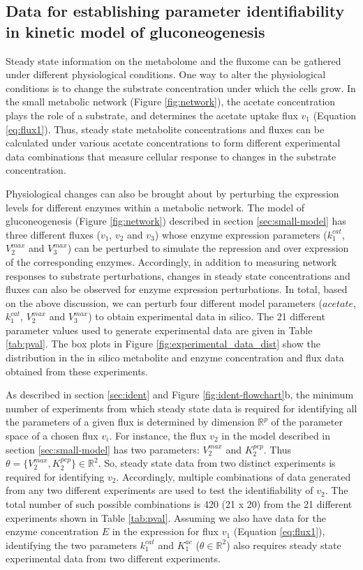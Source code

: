 \documentclass[10pt]{article}
\begin{document}
\subsection{Data for establishing parameter identifiability in kinetic model of gluconeogenesis}\label{sec:experiments}
Steady state information on the metabolome and the fluxome can be gathered under different physiological conditions. One way to alter the physiological conditions is to change the substrate concentration under which the cells grow. In the small metabolic network (Figure \ref{fig:network}), the acetate concentration plays the role of a substrate, and  determines the acetate uptake flux $v_1$ (Equation \ref{eq:flux1}). Thus, steady state metabolite concentrations and fluxes can be calculated under various acetate concentrations to form different experimental data combinations that measure cellular response to changes in the substrate concentration. 

Physiological changes can also be brought about by perturbing the expression levels for different enzymes within a metabolic network. The model of gluconeogenesis (Figure \ref{fig:network}) described in section \ref{sec:small-model} has three different fluxes ($v_1$, $v_2$ and $v_3$) whose enzyme expression parameters ($k_1^{cat}$, $V_2^{max}$ and $V_3^{max}$) can be perturbed to simulate the repression and over expression of the corresponding enzymes. Accordingly, in addition to measuring network responses to substrate perturbations, changes in steady state concentrations and fluxes can also be observed for enzyme expression perturbations. In total, based on the above discussion, we can perturb four different model parameters ($acetate$, $k_1^{cat}$, $V_2^{max}$ and $V_3^{max}$) to obtain experimental data in silico. The 21 different parameter values used to generate experimental data are given in Table \ref{tab:pval}. The box plots in Figure \ref{fig:experimental_data_dist} show the distribution in the in silico metabolite and enzyme concentration and flux data obtained from these experiments.

As described in section \ref{sec:ident} and Figure \ref{fig:ident-flowchart}b, the minimum number of experiments from which steady state data is required for identifying all the parameters of a given flux is determined by dimension $\mathbb{R}^p$ of the parameter space of a chosen flux $v_i$. For instance, the flux $v_2$ in the model described in section \ref{sec:small-model} has two parameters: $V_2^{max}$ and $K_2^{pep}$. Thus $\theta = \{V_2^{max}, K_2^{pep}\} \in \mathbb{R}^2$. So, steady state data from two distinct experiments is required for identifying $v_2$. Accordingly, multiple combinations of data generated from any two different experiments are used to test the identifiability of $v_2$. The total number of such possible combinations is 420 (21 x 20) from the 21 different experiments shown in Table \ref{tab:pval}. Assuming we also have data for the enzyme concentration $E$ in the expression for flux $v_1$ (Equation \ref{eq:flux1}), identifying the two parameters $k_1^{cat}$ and $K_1^{ac}$ ($\theta \in \mathbb{R}^2$) also requires steady state experimental data from two different experiments.
\end{document}
